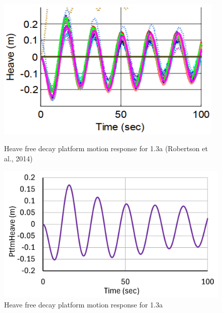 \documentclass[a4paper]{article}
\begin{document}
\begin{figure}[H]
    \begin{minipage}{0.48\textwidth}
        \centering
        \includegraphics[width=0.97\textwidth]{1.3a_heave.png}
        \caption{\small Heave free decay platform motion response for 1.3a (Robertson et al., 2014)}
        \label{fig:1.3a_heave}
    \end{minipage}
    \hfill
    \begin{minipage}{0.49\textwidth}
        \centering
        \includegraphics[width=1\textwidth]{1.3a_heave_mine.png}
        \caption{\small Heave free decay platform motion response for 1.3a}
        \label{fig:1.3a_heave_mine}
    \end{minipage}
\end{figure}
\end{document}
